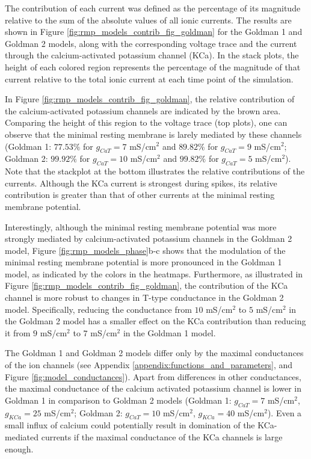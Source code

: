 \documentclass[../main.tex]{subfiles}
\begin{document}
The contribution of each current was defined as the percentage of its magnitude relative to the sum of the absolute values of all ionic currents. The results are shown in Figure \ref{fig:rmp_models_contrib_fig_goldman} for the Goldman 1 and Goldman 2 models, along with the corresponding voltage trace and the current through the calcium-activated potassium channel (KCa). In the stack plots, the height of each colored region represents the percentage of the magnitude of that current relative to the total ionic current at each time point of the simulation.

In Figure \ref{fig:rmp_models_contrib_fig_goldman}, the relative contribution of the calcium-activated potassium channels are indicated by the brown area. Comparing the height of this region to the voltage trace (top plots), one can observe that the minimal resting membrane is larely mediated by these channels (Goldman 1: $77.53\%$ for $g_{CaT}=7$ mS/cm$^2$ and $89.82\%$ for $g_{CaT}=9$ mS/cm$^2$; Goldman 2: $99.92\%$ for $g_{CaT}=10$ mS/cm$^2$ and $99.82\%$ for $g_{CaT}=5$ mS/cm$^2$). Note that the stackplot at the bottom illustrates the relative contributions of the currents. Although the KCa current is strongest during spikes, its relative contribution is greater than that of other currents at the minimal resting membrane potential.

Interestingly, although the minimal resting membrane potential was more strongly mediated by calcium-activated potassium channels in the Goldman 2 model, Figure \ref{fig:rmp_models_phase}b-c shows that the modulation of the minimal resting membrane potential is more pronounced in the Goldman 1 model, as indicated by the colors in the heatmaps. Furthermore, as illustrated in Figure \ref{fig:rmp_models_contrib_fig_goldman}, the contribution of the KCa channel is more robust to changes in T-type conductance in the Goldman 2 model. Specifically, reducing the conductance from $10$ mS/cm$^2$ to $5$ mS/cm$^2$ in the Goldman 2 model has a smaller effect on the KCa contribution than reducing it from $9$ mS/cm$^2$ to $7$ mS/cm$^2$ in the Goldman 1 model.

The Goldman 1 and Goldman 2 models differ only by the maximal conductances of the ion channels (see Appendix \ref{appendix:functions_and_parameters}, and Figure \ref{fig:model_conductances}). Apart from differences in other conductances, the maximal conductance of the calcium activated potassium channel is lower in Goldman 1 in comparison to Goldman 2 models (Goldman 1: $g_{CaT}=7$ mS/cm$^2$, $g_{KCa}=25$ mS/cm$^2$; Goldman 2: $g_{CaT}=10$ mS/cm$^2$, $g_{KCa}=40$ mS/cm$^2$). Even a small influx of calcium could potentially result in domination of the KCa-mediated currents if the maximal conductance of the KCa channels is large enough.
\end{document}

